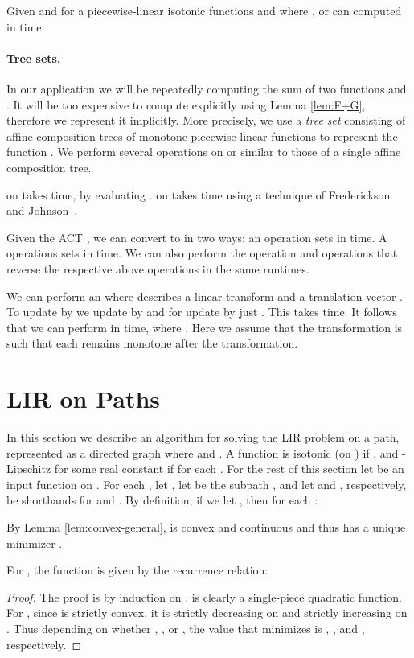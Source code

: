 \documentclass[11pt]{article}
\newcommand{\lir}{LIR }
\begin{document}
\begin{lemma}
Given  and  for a piecewise-linear isotonic functions  and  where ,  or  can computed in  time.
\label{lem:F+G}
\end{lemma}


\paragraph{Tree sets.}
In our application we will be repeatedly computing the sum of two functions  and .  It will be too expensive to compute  explicitly using Lemma \ref{lem:F+G}, therefore we represent it implicitly.  More precisely, we use a \emph{tree set}  consisting of affine composition trees of  monotone piecewise-linear functions  to represent the function . We perform several operations on  or  similar to those of a single affine composition tree.  

 on  takes  time, by evaluating .  
 on  takes  time using a technique of Frederickson and Johnson~\cite{Frederickson:82}.

Given the ACT , we can convert  to  in two ways:
an  operation sets  in  time.
A  operations sets  in  time.
We can also perform the operation  and  operations that reverse the respective above operations in the same runtimes.  

We can perform an  where  describes a linear transform  and a translation vector .  To update  by  we update  by  and for  update  by just .  This takes  time.  It follows that we can perform  in  time, where .  Here we assume that the transformation  is such that each  remains monotone after the transformation.  



\section{LIR on Paths}\label{sec:pathlir}
In this section we describe an algorithm for solving the \lir problem on a path, represented as a directed graph  where  and .   A function  is isotonic (on ) if , and -Lipschitz for some real constant  if  for each . 
For the rest of this section let  be an input function on . 
For each , let , let  be the subpath , and let  and , respectively, be shorthands for  and .
By definition, if we let , then for each : 
 
By Lemma \ref{lem:convex-general},  is convex and continuous and thus has a unique minimizer .

\begin{lemma}\label{lem:convex}
For , the function  is given by the recurrence relation:

\end{lemma}
\begin{proof}
The proof is by induction on .  is clearly a single-piece quadratic function. For , since  is strictly convex, it is strictly decreasing on  and strictly increasing on . Thus depending on whether , , or , the value  that minimizes  is , , and , respectively. 
\end{proof}
\end{document}
